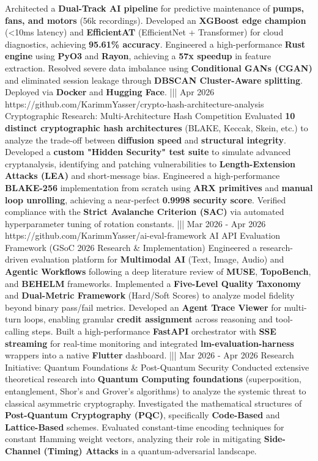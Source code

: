 {    {Architected a \textbf{Dual-Track AI pipeline} for predictive maintenance of \textbf{pumps, fans, and motors} (56k recordings). Developed an \textbf{XGBoost edge champion} (<10ms latency) and \textbf{EfficientAT} (EfficientNet + Transformer) for cloud diagnostics, achieving \textbf{95.61\% accuracy}. Engineered a high-performance \textbf{Rust engine} using \textbf{PyO3} and \textbf{Rayon}, achieving a \textbf{57x speedup} in feature extraction. Resolved severe data imbalance using \textbf{Conditional GANs (CGAN)} and eliminated session leakage through \textbf{DBSCAN Cluster-Aware splitting}. Deployed via \textbf{Docker} and \textbf{Hugging Face}.}%
    |||
    {Apr 2026}%
    {https://github.com/KarimmYasser/crypto-hash-architecture-analysis}%
    {Cryptographic Research: Multi-Architecture Hash Competition}%
    {Evaluated \textbf{10 distinct cryptographic hash architectures} (BLAKE, Keccak, Skein, etc.) to analyze the trade-off between \textbf{diffusion speed} and \textbf{structural integrity}. Developed a \textbf{custom "Hidden Security" test suite} to simulate advanced cryptanalysis, identifying and patching vulnerabilities to \textbf{Length-Extension Attacks (LEA)} and short-message bias. Engineered a high-performance \textbf{BLAKE-256} implementation from scratch using \textbf{ARX primitives} and \textbf{manual loop unrolling}, achieving a near-perfect \textbf{0.9998 security score}. Verified compliance with the \textbf{Strict Avalanche Criterion (SAC)} via automated hyperparameter tuning of rotation constants.}%
    |||
    {Mar 2026 - Apr 2026}%
    {https://github.com/KarimmYasser/ai-eval-framework}%
    {AI API Evaluation Framework (GSoC 2026 Research \& Implementation)}%
    {Engineered a research-driven evaluation platform for \textbf{Multimodal AI} (Text, Image, Audio) and \textbf{Agentic Workflows} following a deep literature review of \textbf{MUSE}, \textbf{TopoBench}, and \textbf{BEHELM} frameworks. Implemented a \textbf{Five-Level Quality Taxonomy} and \textbf{Dual-Metric Framework} (Hard/Soft Scores) to analyze model fidelity beyond binary pass/fail metrics. Developed an \textbf{Agent Trace Viewer} for multi-turn loops, enabling granular \textbf{credit assignment} across reasoning and tool-calling steps. Built a high-performance \textbf{FastAPI} orchestrator with \textbf{SSE streaming} for real-time monitoring and integrated \textbf{lm-evaluation-harness} wrappers into a native \textbf{Flutter} dashboard.}%
    |||
    {Mar 2026 - Apr 2026}%
    {}%
    {Research Initiative: Quantum Foundations \& Post-Quantum Security}%
    {Conducted extensive theoretical research into \textbf{Quantum Computing foundations} (superposition, entanglement, Shor's and Grover's algorithms) to analyze the systemic threat to classical asymmetric cryptography. Investigated the mathematical structures of \textbf{Post-Quantum Cryptography (PQC)}, specifically \textbf{Code-Based} and \textbf{Lattice-Based} schemes. Evaluated constant-time encoding techniques for constant Hamming weight vectors, analyzing their role in mitigating \textbf{Side-Channel (Timing) Attacks} in a quantum-adversarial landscape.}%
}
